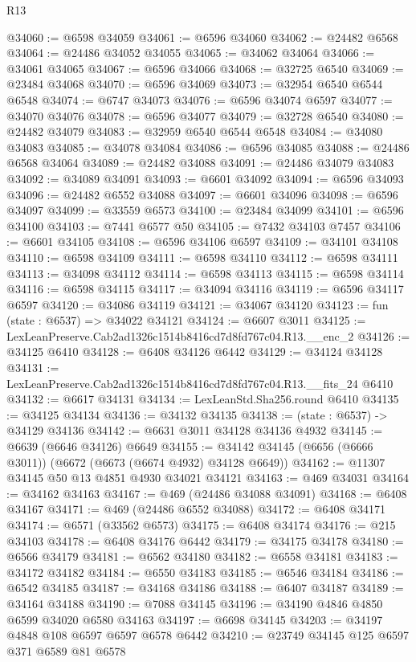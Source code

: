\begin{lexlean}{R13}
\begin{coremodule}
@34060 := @6598 @34059
@34061 := @6596 @34060
@34062 := @24482 @6568
@34064 := @24486 @34052 @34055
@34065 := @34062 @34064
@34066 := @34061 @34065
@34067 := @6596 @34066
@34068 := @32725 @6540
@34069 := @23484 @34068
@34070 := @6596 @34069
@34073 := @32954 @6540 @6544 @6548
@34074 := @6747 @34073
@34076 := @6596 @34074 @6597
@34077 := @34070 @34076
@34078 := @6596 @34077
@34079 := @32728 @6540
@34080 := @24482 @34079
@34083 := @32959 @6540 @6544 @6548
@34084 := @34080 @34083
@34085 := @34078 @34084
@34086 := @6596 @34085
@34088 := @24486 @6568 @34064
@34089 := @24482 @34088
@34091 := @24486 @34079 @34083
@34092 := @34089 @34091
@34093 := @6601 @34092
@34094 := @6596 @34093
@34096 := @24482 @6552 @34088
@34097 := @6601 @34096
@34098 := @6596 @34097
@34099 := @33559 @6573
@34100 := @23484 @34099
@34101 := @6596 @34100
@34103 := @7441 @6577 @50
@34105 := @7432 @34103 @7457
@34106 := @6601 @34105
@34108 := @6596 @34106 @6597
@34109 := @34101 @34108
@34110 := @6598 @34109
@34111 := @6598 @34110
@34112 := @6598 @34111
@34113 := @34098 @34112
@34114 := @6598 @34113
@34115 := @6598 @34114
@34116 := @6598 @34115
@34117 := @34094 @34116
@34119 := @6596 @34117 @6597
@34120 := @34086 @34119
@34121 := @34067 @34120
@34123 := fun (state : @6537) => @34022 @34121
@34124 := @6607 @3011
@34125 := LexLeanPreserve.Cab2ad1326c1514b8416cd7d8fd767c04.R13.__enc_2
@34126 := @34125 @6410
@34128 := @6408 @34126 @6442
@34129 := @34124 @34128
@34131 := LexLeanPreserve.Cab2ad1326c1514b8416cd7d8fd767c04.R13.__fits_24 @6410
@34132 := @6617 @34131
@34134 := LexLeanStd.Sha256.round @6410
@34135 := @34125 @34134
@34136 := @34132 @34135
@34138 := (state : @6537) -> @34129 @34136
@34142 := @6631 @3011 @34128 @34136 @4932
@34145 := @6639 (@6646 @34126) @6649
@34155 := @34142 @34145 (@6656 (@6666 @3011)) (@6672 (@6673 (@6674 @4932) @34128 @6649))
@34162 := @11307 @34145 @50 @13 @4851 @4930 @34021 @34121
@34163 := @469 @34031
@34164 := @34162 @34163
@34167 := @469 (@24486 @34088 @34091)
@34168 := @6408 @34167
@34171 := @469 (@24486 @6552 @34088)
@34172 := @6408 @34171
@34174 := @6571 (@33562 @6573)
@34175 := @6408 @34174
@34176 := @215 @34103
@34178 := @6408 @34176 @6442
@34179 := @34175 @34178
@34180 := @6566 @34179
@34181 := @6562 @34180
@34182 := @6558 @34181
@34183 := @34172 @34182
@34184 := @6550 @34183
@34185 := @6546 @34184
@34186 := @6542 @34185
@34187 := @34168 @34186
@34188 := @6407 @34187
@34189 := @34164 @34188
@34190 := @7088 @34145
@34196 := @34190 @4846 @4850 @6599 @34020 @6580 @34163
@34197 := @6698 @34145
@34203 := @34197 @4848 @108 @6597 @6597 @6578 @6442
@34210 := @23749 @34145 @125 @6597 @371 @6589 @81 @6578

\end{coremodule}
\end{lexlean}
